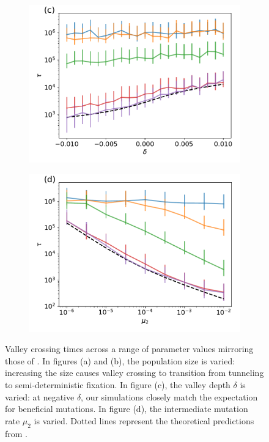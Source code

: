 \documentclass[10pt,twocolumn,twoside]{gsajnl}
\begin{document}
\begin{spacing}{1.5}
\begin{figure}[t]
\begin{subfigure}[c]{0.5\textwidth}
\includegraphics[width=\textwidth]{Figures/julia_weissman_5c.pdf}
\end{subfigure}
\begin{subfigure}[d]{0.5\textwidth}
\includegraphics[width=\textwidth]{Figures/julia_weissman_5d.pdf}
\end{subfigure}
\caption{Valley crossing times across a range of parameter values mirroring those of \citet{weissman_2009}. In figures (a) and (b), the population size is varied: increasing the size causes valley crossing to transition from tunneling to semi-deterministic fixation. In figure (c), the valley depth $\delta$ is varied: at negative $\delta$, our simulations closely match the expectation for beneficial mutations. In figure (d), the intermediate mutation rate $\mu_2$ is varied. Dotted lines represent the theoretical predictions from \citet{weissman_2009}.}
\label{fig:weissman}
\end{figure}


\end{spacing}
\end{document}
